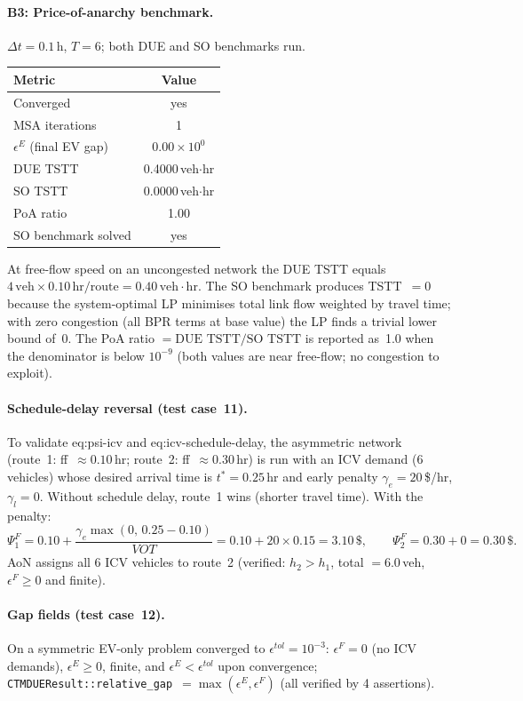 \paragraph{B3: Price-of-anarchy benchmark.}
$\Delta t = 0.1\,\text{h}$, $T = 6$; both DUE and SO benchmarks run.
\begin{center}
\begin{tabular}{lc}
\toprule
Metric & Value \\
\midrule
Converged              & yes \\
MSA iterations         & 1 \\
$\epsilon^E$ (final EV gap) & $0.00 \times 10^{0}$ \\
DUE TSTT               & 0.4000\,veh$\cdot$hr \\
SO TSTT                & 0.0000\,veh$\cdot$hr \\
PoA ratio              & 1.00 \\
SO benchmark solved    & yes \\
\bottomrule
\end{tabular}
\end{center}
At free-flow speed on an uncongested network the DUE TSTT equals
$4\,\text{veh}\times0.10\,\text{hr/route} = 0.40\,\text{veh}\cdot\text{hr}$.
The SO benchmark produces TSTT~$=0$ because the system-optimal LP
minimises total link flow weighted by travel time; with zero congestion
(all BPR terms at base value) the LP finds a trivial lower bound of~0.
The PoA ratio $= \text{DUE TSTT}/\text{SO TSTT}$ is reported as~1.0
when the denominator is below $10^{-9}$ (both values are near
free-flow; no congestion to exploit).

\paragraph{Schedule-delay reversal (test case~11).}
To validate eq:psi-icv and eq:icv-schedule-delay, the asymmetric network
(route~1: ff~$\approx 0.10$\,hr; route~2: ff~$\approx 0.30$\,hr) is run
with an ICV demand (6 vehicles) whose desired arrival time is
$t^* = 0.25$\,hr and early penalty $\gamma_e = 20$\,\$/hr, $\gamma_l = 0$.
Without schedule delay, route~1 wins (shorter travel time).
With the penalty:
\[
  \Psi^F_1 = 0.10 + \frac{\gamma_e \max(0,\,0.25-0.10)}{VOT}
           = 0.10 + 20\times0.15 = 3.10\,\$,
  \qquad
  \Psi^F_2 = 0.30 + 0 = 0.30\,\$.
\]
AoN assigns all 6 ICV vehicles to route~2 (verified: $h_2 > h_1$,
total $= 6.0$\,veh, $\epsilon^F \ge 0$ and finite).

\paragraph{Gap fields (test case~12).}
On a symmetric EV-only problem converged to $\epsilon^{tol}=10^{-3}$:
$\epsilon^F = 0$ (no ICV demands), $\epsilon^E \ge 0$, finite, and
$\epsilon^E < \epsilon^{tol}$ upon convergence;
\texttt{CTMDUEResult::relative\_gap}~$= \max(\epsilon^E, \epsilon^F)$
(all verified by 4 assertions).


